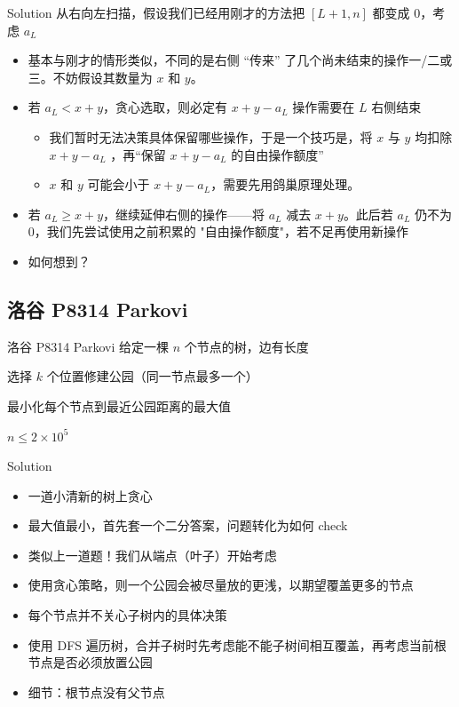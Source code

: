 ﻿\documentclass[aspectratio=169,handout]{ctexbeamer}
\begin{document}
\begin{frame}{Solution}
    从右向左扫描，假设我们已经用刚才的方法把 $[L+1,n]$ 都变成 $0$，考虑 $a_L$
    \begin{itemize}
        \item 基本与刚才的情形类似，不同的是右侧 “传来” 了几个\textcolor{peaking}{尚未结束的}操作一/二或三。不妨假设其数量为 $x$ 和 $y$。
        \pause
        \item 若 $a_L<x+y$，贪心选取，则必定有 $x+y-a_L$ 操作需要在 $L$ 右侧结束
        \begin{itemize}
            \item 我们暂时无法决策具体保留哪些操作，于是一个技巧是，将 $x$ 与 $y$ 均扣除 $ x+y-a_L $ ，再“保留 $x+y-a_L$ 的自由操作额度”
            \item $x$ 和 $y$ 可能会小于 $x+y-a_L$，需要先用鸽巢原理处理。
        \end{itemize}
        \pause
        \item 若 $a_L\ge x+y$，继续延伸右侧的操作——将 $a_L$ 减去 $x+y$。此后若 $a_L$ 仍不为 $ 0 $，我们先尝试使用之前积累的 "自由操作额度"，若不足再使用新操作
        \item 如何想到？
    \end{itemize}
\end{frame}









\subsection{洛谷 P8314 Parkovi}
\begin{frame}{洛谷 P8314 Parkovi}
    给定一棵 $n$ 个节点的树，边有长度

选择 $k$ 个位置修建公园（同一节点最多一个）

最小化每个节点到最近公园距离的最大值

$n\leq 2\times 10^5$
\end{frame}

\begin{frame}{Solution}
    \begin{itemize}
        \item 一道小清新的树上贪心
        \pause
        \item 最大值最小，首先套一个二分答案，问题转化为如何 check
        \pause
        \item 类似上一道题！我们从端点（叶子）开始考虑
        \pause
        \item 使用贪心策略，则一个公园会被尽量放的更浅，以期望覆盖更多的节点
        \pause
        \item 每个节点并不关心子树内的具体决策
        \pause
        \item 使用 DFS 遍历树，合并子树时先考虑能不能子树间相互覆盖，再考虑当前根节点是否必须放置公园
        \item 细节：根节点没有父节点 
    \end{itemize}
\end{frame}
\end{document}
